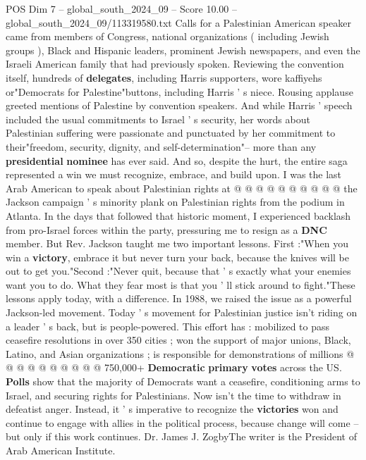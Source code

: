 \begin{textsample}{POS Dim 7 – global\_south\_2024\_09 – Score 10.00 – global\_south\_2024\_09/113319580.txt}
Calls for a Palestinian American speaker came from members of Congress, national organizations ( including Jewish groups ), Black and Hispanic leaders, prominent Jewish newspapers, and even the Israeli American family that had previously spoken.
Reviewing the convention itself, hundreds of \textbf{delegates}, including Harris supporters, wore kaffiyehs or"Democrats for Palestine"buttons, including Harris ' s niece.
Rousing applause greeted mentions of Palestine by convention speakers.
And while Harris ' speech included the usual commitments to Israel ' s security, her words about Palestinian suffering were passionate and punctuated by her commitment to their"freedom, security, dignity, and self-determination"-- more than any \textbf{presidential} \textbf{nominee} has ever said.
And so, despite the hurt, the entire saga represented a win we must recognize, embrace, and build upon.
I was the last Arab American to speak about Palestinian rights at @ @ @ @ @ @ @ @ @ @ the Jackson campaign ' s minority plank on Palestinian rights from the podium in Atlanta.
In the days that followed that historic moment, I experienced backlash from pro-Israel forces within the party, pressuring me to resign as a \textbf{DNC} member.
But Rev.
Jackson taught me two important lessons.
First :"When you win a \textbf{victory}, embrace it but never turn your back, because the knives will be out to get you."Second :"Never quit, because that ' s exactly what your enemies want you to do.
What they fear most is that you ' ll stick around to fight."These lessons apply today, with a difference.
In 1988, we raised the issue as a powerful Jackson-led movement.
Today ' s movement for Palestinian justice isn't riding on a leader ' s back, but is people-powered.
This effort has : mobilized to pass ceasefire resolutions in over 350 cities ; won the support of major unions, Black, Latino, and Asian organizations ; is responsible for demonstrations of millions @ @ @ @ @ @ @ @ @ @ 750,000+ \textbf{Democratic} \textbf{primary} \textbf{votes} across the US. \textbf{Polls} show that the majority of Democrats want a ceasefire, conditioning arms to Israel, and securing rights for Palestinians.
Now isn't the time to withdraw in defeatist anger.
Instead, it ' s imperative to recognize the \textbf{victories} won and continue to engage with allies in the political process, because change will come -- but only if this work continues.
Dr.
James J.
ZogbyThe writer is the President of Arab American Institute.

\end{textsample}
